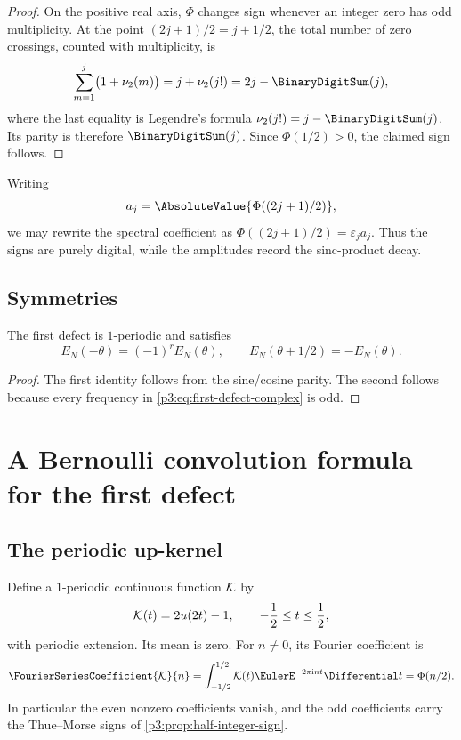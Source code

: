 \documentclass[11pt,oneside]{article}
\numberwithin{equation}{section}
\theoremstyle{definition}
\theoremstyle{remark}
\newcommand{\eps}{\varepsilon}
\begin{document}
\begin{proof}
On the positive real axis, $\Phi$ changes sign whenever an integer zero has odd multiplicity.  At the point $(2j+1)/2=j+1/2$, the total number of zero crossings, counted with multiplicity, is
\[
 \sum_{m=1}^{j}\bigl(1+\nu_2(m)\bigr)
 =j+\nu_2(j!)
 =2j-\BinaryDigitSum(j),
\]
where the last equality is Legendre's formula
$\nu_2(j!)=j-\BinaryDigitSum(j)$.  Its parity is therefore $\BinaryDigitSum(j)$.  Since
$\Phi(1/2)>0$, the claimed sign follows.
\end{proof}

Writing
\begin{equation}
 a_j=\AbsoluteValue{\Phi((2j+1)/2)},
 \label{p3:eq:half-amplitudes}
\end{equation}
we may rewrite the spectral coefficient as $\Phi((2j+1)/2)=\eps_ja_j$.  Thus the signs are purely digital, while the amplitudes record the sinc-product decay.

\subsection{Symmetries}

\begin{corollary}
\label{p3:cor:defect-symmetries}
The first defect is $1$-periodic and satisfies
\begin{equation}
 E_N(-\theta)=(-1)^rE_N(\theta),
 \qquad
 E_N(\theta+1/2)=-E_N(\theta).
 \label{p3:eq:defect-symmetries}
\end{equation}
\end{corollary}

\begin{proof}
The first identity follows from the sine/cosine parity.  The second follows because every frequency in \eqref{p3:eq:first-defect-complex} is odd.
\end{proof}

\section{A Bernoulli convolution formula for the first defect}
\label{p3:sec:bernoulli-kernel}

\subsection{The periodic up-kernel}

Define a $1$-periodic continuous function $\mathcal K$ by
\begin{equation}
 \mathcal K(t)=2u(2t)-1,
 \qquad -\frac12\le t\le\frac12,
 \label{p3:eq:K-kernel}
\end{equation}
with periodic extension.  Its mean is zero.  For $n\ne0$, its Fourier coefficient is
\begin{equation}
 \FourierSeriesCoefficient{\Kcal}{n}
 =\int_{-1/2}^{1/2}\Kcal(t)\EulerE^{-2\pi\iu nt}\Differential t
 =\Phi(n/2).
 \label{p3:eq:K-Fourier}
\end{equation}
In particular the even nonzero coefficients vanish, and the odd coefficients carry the Thue--Morse signs of \cref{p3:prop:half-integer-sign}.
\end{document}
